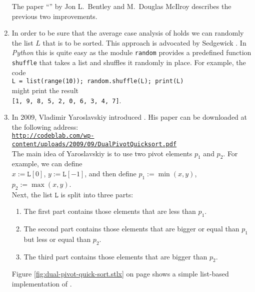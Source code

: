 \begin{enumerate}
      The paper ``'' by Jon L.~Bentley and M.~Douglas McIlroy
      \cite{bentley:93} describes the previous two improvements.
\item In order to be sure that the average case analysis of  holds we can randomly
       the list $L$ that is to be sorted.  This approach is advocated by Sedgewick
      \cite{sedgewick:2011}.  In \textsl{Python} this is quite easy as
      the module \texttt{random} provides a predefined function \texttt{shuffle} that takes a list and shuffles
      it randomly in place.  For example, the code
      \\[0.2cm]
      \hspace*{1.3cm}
      \texttt{L = list(range(10)); random.shuffle(L); print(L)}
      \\[0.2cm]
      might print the result
      \\[0.2cm]
      \hspace*{1.3cm}
      \texttt{[1, 9, 8, 5, 2, 0, 6, 3, 4, 7]}.
\item In 2009, Vladimir Yaroslavskiy introduced 
      \cite{yaroslavskiy:2009}.
      His paper can be
      downloaded at the following address:
      \\[0.2cm]
      \hspace*{1.3cm}
      \href{http://codeblab.com/wp-content/uploads/2009/09/DualPivotQuicksort.pdf}{\texttt{http://codeblab.com/wp-content/uploads/2009/09/DualPivotQuicksort.pdf}}
      \\[0.2cm]
      The main idea of Yaroslavskiy is to use two pivot elements $p_1$ and $p_2$.  For example, we can
      define
      \\[0.2cm]
      \hspace*{1.3cm}
      $x := \mathtt{L}[0]$, $y := \mathtt{L}[-1]$, \quad and then define \quad $p_1 :=\min(x, y)$, $p_2 := \max(x, y)$.
      \\[0.2cm]
      Next, the list $\mathtt{L}$ is split into three parts:
      \begin{enumerate}
      \item The first part contains those elements that are less than $p_1$.
      \item The second part contains those elements that are bigger or equal than $p_1$ but less or
            equal than $p_2$.
      \item The third part contains those elements that are bigger than $p_2$.
      \end{enumerate}
      Figure \ref{fig:dual-pivot-quick-sort.stlx} on page \pageref{fig:dual-pivot-quick-sort.stlx}
      shows a simple list-based implementation of .


\end{enumerate}
